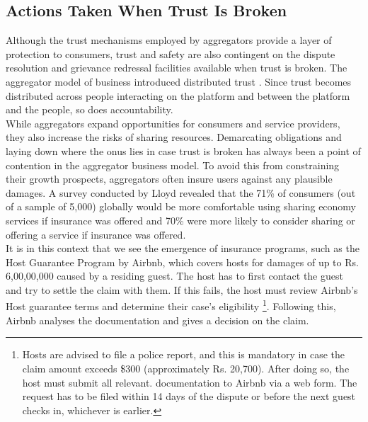 \documentclass[a4paper, 12pt]{article}
\begin{document}
               
                    
                    \subsection{Actions Taken When Trust Is Broken}
                    
                    Although the trust mechanisms employed by aggregators provide a layer of protection to consumers, trust and safety are also contingent on the dispute resolution and grievance redressal facilities available when trust is broken. The aggregator model of business introduced distributed trust \parencite{BotsmanR}. Since trust becomes distributed across people interacting on the platform and between the platform and the people, so does accountability.\\

While aggregators expand opportunities for consumers and service providers, they also increase the risks of sharing resources. Demarcating obligations and laying down where the onus lies in case trust is broken has always been a point of contention in the aggregator business model. To avoid this from constraining their growth prospects, aggregators often insure users against any plausible damages. A survey conducted by Lloyd revealed that the 71\% of consumers (out of a sample of 5,000) globally would be more comfortable using sharing economy services if insurance was offered and 70\% were more likely to consider sharing or offering a service if insurance was offered. \\

It is in this context that we see the emergence of insurance programs, such as the Host Guarantee Program by Airbnb, which covers hosts for damages of up to Rs. 6,00,00,000 caused by a residing guest. The host has to first contact the guest and try to settle the claim with them. If this fails, the host must review Airbnb's Host guarantee terms and determine their case’s eligibility \footnote {Hosts are advised to file a police report, and this is mandatory in case the claim amount exceeds \$300 (approximately Rs. 20,700). After doing so, the host must submit all relevant. documentation to Airbnb via a web form. The request has to be filed within 14 days of the dispute or before the next guest checks in, whichever is earlier.}.  Following this, Airbnb analyses the documentation and gives a decision on the claim. \\
\end{document}
